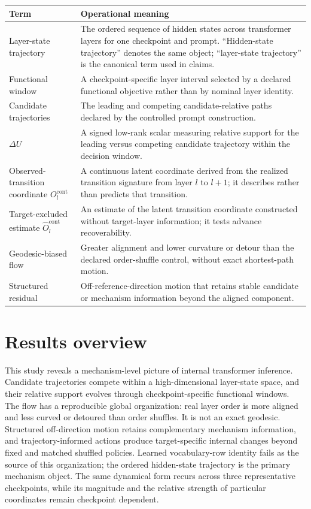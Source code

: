 \documentclass[11pt]{article}
\begin{document}
\begin{table}[H]
\centering\scriptsize\sloppy
\begin{tabularx}{\textwidth}{@{}XX@{}}
\toprule
Term & Operational meaning \\
\midrule
Layer-state trajectory & The ordered sequence of hidden states across transformer layers for one checkpoint and prompt. “Hidden-state trajectory” denotes the same object; “layer-state trajectory” is the canonical term used in claims. \\
Functional window & A checkpoint-specific layer interval selected by a declared functional objective rather than by nominal layer identity. \\
Candidate trajectories & The leading and competing candidate-relative paths declared by the controlled prompt construction. \\
\(\Delta U\) & A signed low-rank scalar measuring relative support for the leading versus competing candidate trajectory within the decision window. \\
Observed-transition coordinate \(O_l^{\mathrm{cont}}\) & A continuous latent coordinate derived from the realized transition signature from layer \(l\) to \(l+1\); it describes rather than predicts that transition. \\
Target-excluded estimate \(\widehat O_l^{\mathrm{cont}}\) & An estimate of the latent transition coordinate constructed without target-layer information; it tests advance recoverability. \\
Geodesic-biased flow & Greater alignment and lower curvature or detour than the declared order-shuffle control, without exact shortest-path motion. \\
Structured residual & Off-reference-direction motion that retains stable candidate or mechanism information beyond the aligned component. \\
\bottomrule
\end{tabularx}
\end{table}

\section*{Results overview}
This study reveals a mechanism-level picture of internal transformer inference. Candidate trajectories compete within a high-dimensional layer-state space, and their relative support evolves through checkpoint-specific functional windows. The flow has a reproducible global organization: real layer order is more aligned and less curved or detoured than order shuffles. It is not an exact geodesic. Structured off-direction motion retains complementary mechanism information, and trajectory-informed actions produce target-specific internal changes beyond fixed and matched shuffled policies. Learned vocabulary-row identity fails as the source of this organization; the ordered hidden-state trajectory is the primary mechanism object. The same dynamical form recurs across three representative checkpoints, while its magnitude and the relative strength of particular coordinates remain checkpoint dependent.
\end{document}
